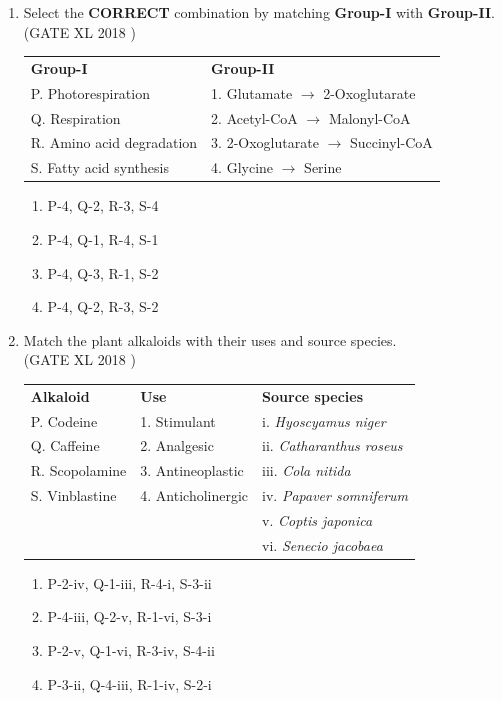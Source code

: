 \documentclass[14pt]{extarticle}
\begin{document}
\begin{flushleft}
\begin{enumerate}[leftmargin=*]
\item Select the \textbf{CORRECT} combination by matching \textbf{Group-I} with \textbf{Group-II}.\\
\hfill(GATE XL 2018 )
\begin{tabular}{p{5cm} p{6cm}}
\textbf{Group-I} & \textbf{Group-II} \\
P. Photorespiration & 1. Glutamate $\rightarrow$ 2-Oxoglutarate \\
Q. Respiration & 2. Acetyl-CoA $\rightarrow$ Malonyl-CoA \\
R. Amino acid degradation & 3. 2-Oxoglutarate $\rightarrow$ Succinyl-CoA \\
S. Fatty acid synthesis & 4. Glycine $\rightarrow$ Serine \\
\end{tabular}

\begin{enumerate}[label=(\Alph*)]
    \item P-4, Q-2, R-3, S-4
    \item P-4, Q-1, R-4, S-1
    \item P-4, Q-3, R-1, S-2
    \item P-4, Q-2, R-3, S-2
\end{enumerate}

\item Match the plant alkaloids with their uses and source species.\\
\hfill(GATE XL 2018 )
\begin{tabular}{p{3cm} p{4cm} p{6cm}}
\textbf{Alkaloid} & \textbf{Use} & \textbf{Source species} \\
P. Codeine & 1. Stimulant & i. \textit{Hyoscyamus niger} \\
Q. Caffeine & 2. Analgesic & ii. \textit{Catharanthus roseus} \\
R. Scopolamine & 3. Antineoplastic & iii. \textit{Cola nitida} \\
S. Vinblastine & 4. Anticholinergic & iv. \textit{Papaver somniferum} \\
 & & v. \textit{Coptis japonica} \\
 & & vi. \textit{Senecio jacobaea} \\
\end{tabular}

\begin{enumerate}[label=(\Alph*)]
    \item P-2-iv, Q-1-iii, R-4-i, S-3-ii
    \item P-4-iii, Q-2-v, R-1-vi, S-3-i
    \item P-2-v, Q-1-vi, R-3-iv, S-4-ii
    \item P-3-ii, Q-4-iii, R-1-iv, S-2-i
\end{enumerate}


\end{enumerate}
\end{flushleft}
\end{document}
